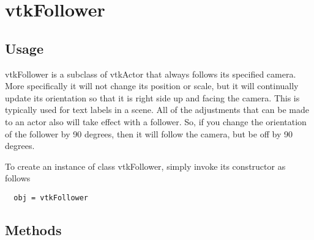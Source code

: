 \section{vtkFollower}

\subsection{Usage}

 vtkFollower is a subclass of vtkActor that always follows its specified 
 camera. More specifically it will not change its position or scale,
 but it will continually update its orientation so that it is right side
 up and facing the camera. This is typically used for text labels in a
 scene. All of the adjustments that can be made to an actor also will
 take effect with a follower.  So, if you change the orientation of the
 follower by 90 degrees, then it will follow the camera, but be off by 
 90 degrees.

To create an instance of class vtkFollower, simply
invoke its constructor as follows
\begin{verbatim}
  obj = vtkFollower
\end{verbatim}
\subsection{Methods}

